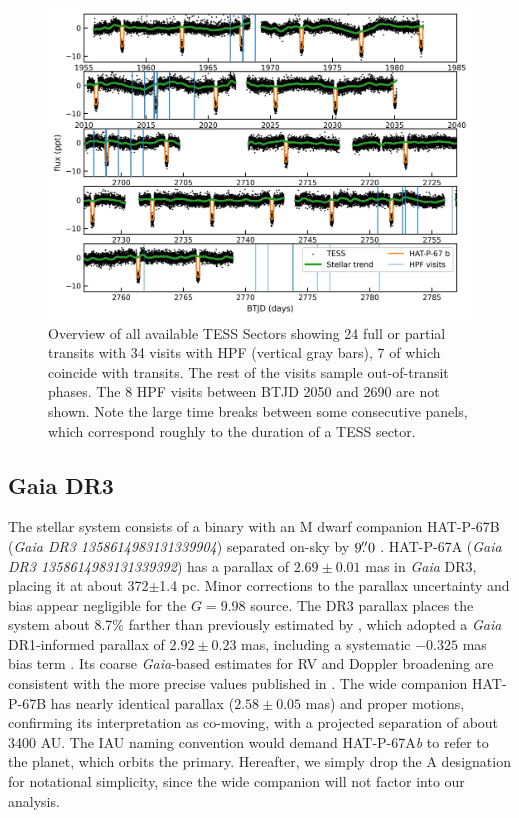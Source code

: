 \documentclass[twocolumn]{aastex631}
\begin{document}
\begin{figure}
    \centering
    \includegraphics[width=0.98\linewidth]{figures/TESS_HAT-P-67b_overview.png}
    \caption{Overview of all available TESS Sectors showing 24 full or partial transits with 34 visits with HPF (vertical gray bars), 7 of which coincide with transits.  The rest of the visits sample out-of-transit phases.  The 8 HPF visits between BTJD 2050 and 2690 are not shown.  Note the large time breaks between some consecutive panels, which correspond roughly to the duration of a TESS sector.}
    \label{fig:TESSoverview}
\end{figure}

\subsection{Gaia DR3}\label{gaiadr3}
The stellar system consists of a binary with an M dwarf companion HAT-P-67B (\emph{Gaia DR3 1358614983131339904}) separated on-sky by $9\mbox{$.\!\!^{\prime\prime}$}0$ \citep{2019MNRAS.490.5088M}.  HAT-P-67A (\emph{Gaia DR3 1358614983131339392}) has a parallax of $2.69\pm0.01$ mas in \emph{Gaia} DR3, placing it at about 372$\pm$1.4 pc.  Minor corrections to the parallax uncertainty \citep{2021MNRAS.506.2269E} and bias \citep{2021A&A...649A...4L} appear negligible for the $G=9.98$ source.  The DR3 parallax places the system about 8.7\% farther than previously estimated by \citet{2017AJ....153..211Z}, which adopted a \emph{Gaia} DR1-informed parallax of $2.92\pm0.23$ mas, including a systematic $-0.325$ mas bias term \citep{2016ApJ...831L...6S}.  Its coarse \emph{Gaia}-based estimates for RV and Doppler broadening are consistent with the more precise values published in \citet{2017AJ....153..211Z}.  The wide companion HAT-P-67B has nearly identical parallax ($2.58\pm0.05$ mas) and proper motions, confirming its interpretation as co-moving, with a projected separation of about 3400 AU.  The IAU naming convention would demand HAT-P-67A\emph{b} to refer to the planet, which orbits the primary.  Hereafter, we simply drop the A designation for notational simplicity, since the wide companion will not factor into our analysis.
\end{document}

